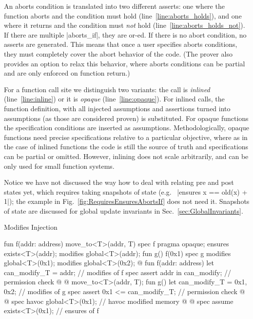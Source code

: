 An aborts condition is translated into two different asserts: one where the
function aborts and the condition must hold (line~\ref{line:aborts_holds}), and
one where it returns and the condition must \emph{not} hold
(line~\ref{line:aborts_holds_not}). If there are multiple |aborts_if|, they are
or-ed. If there is no abort condition, no asserts are generated. This means
that once a user specifies aborts conditions, they must completely cover the
abort behavior of the code. (The prover also provides an option to relax this
behavior, where aborts conditions can be partial and are only enforced on
function return.)

For a function call site we distinguish two variants: the call is \emph{inlined}
(line~\ref{line:inline}) or it is \emph{opaque} (line~\ref{line:opaque}).  For
inlined calls, the function definition, with all injected assumptions and
assertions turned into assumptions (as those are considered proven) is
substituted. For opaque functions the specification conditions are inserted as
assumptions. Methodologically, opaque functions need precise specifications
relative to a particular objective, where as in the case of inlined functions
the code is still the source of truth and specifications can be partial or
omitted. However, inlining does not scale arbitrarily, and can be only used for
small function systems.

Notice we have not discussed the way how to deal with relating pre and post
states yet, which requires taking snapshots of state (e.g.~%
|ensures x == old(x) + 1|); the example in
Fig.~\ref{fig:RequiresEnsuresAbortsIf} does not need it. Snapshots of state
are discussed for global update invariants in Sec.~\ref{sec:GlobalInvariants}.


\begin{Figure}
  \caption{Modifies Injection}
  \label{fig:Modifies}
  \centering
\begin{MoveBoxNumbered}
  fun f(addr: address) { move_to<T>(addr, T{}) }
  spec f {
    pragma opaque;
    ensures exists<T>(addr);
    modifies global<T>(addr);
  }
  fun g() { f(0x1) }
  spec g {
    modifies global<T>(0x1); modifies global<T>(0x2);
  }
  @\transform@
  fun f(addr: address) {
    let can_modify_T = {addr};      // modifies of f
    spec assert addr in can_modify; // permission check @%
                                            \label{line:modifies_permission}@
    move_to<T>(addr, T{});
  }
  fun g() {
    let can_modify_T = {0x1, 0x2};  // modifies of g
    spec assert {0x1} <= can_modify_T; // permission check @%
                                            \label{line:modifies_call_permission}@
    spec havoc global<T>(0x1);      // havoc modified memory @%
                                            \label{line:modifies_havoc}@
    spec assume exists<T>(0x1);     // ensures of f
  }
\end{MoveBoxNumbered}
\end{Figure}


